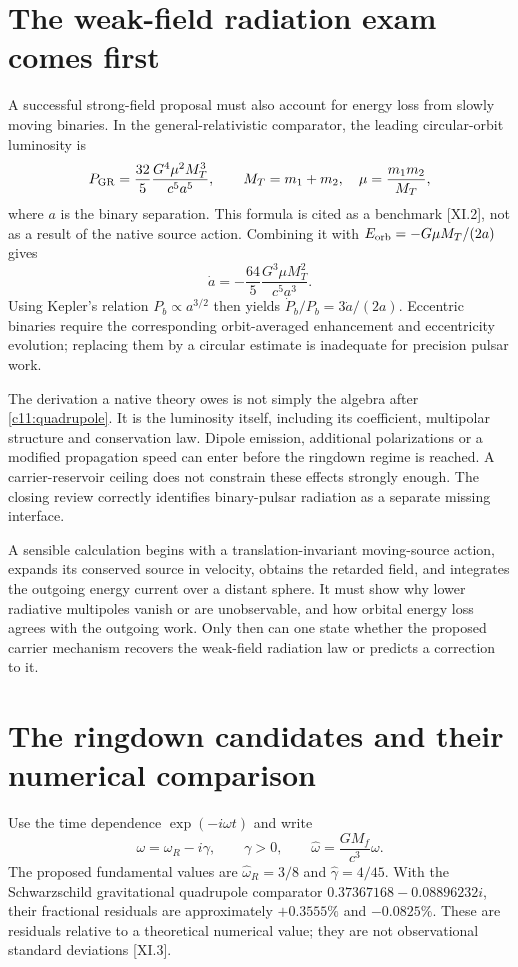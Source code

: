 \section{The weak-field radiation exam comes first}
A successful strong-field proposal must also account for energy loss from slowly moving binaries. In the general-relativistic comparator, the leading circular-orbit luminosity is
\begin{equation}
 P_{\rm GR}=\frac{32}{5}\frac{G^4\mu^2 M_T^3}{c^5 a^5},
 \qquad M_T=m_1+m_2,\quad \mu=\frac{m_1m_2}{M_T},
 \label{c11:quadrupole}
\end{equation}
where $a$ is the binary separation. This formula is cited as a benchmark [XI.2], not as a result of the native source action. Combining it with $E_{\rm orb}=-G\mu M_T/(2a)$ gives
\begin{equation}
 \dot a=-\frac{64}{5}\frac{G^3\mu M_T^2}{c^5a^3}.
 \label{c11:adot}
\end{equation}
Using Kepler's relation $P_b\propto a^{3/2}$ then yields $\dot P_b/P_b=3\dot a/(2a)$. Eccentric binaries require the corresponding orbit-averaged enhancement and eccentricity evolution; replacing them by a circular estimate is inadequate for precision pulsar work.

The derivation a native theory owes is not simply the algebra after \eqref{c11:quadrupole}. It is the luminosity itself, including its coefficient, multipolar structure and conservation law. Dipole emission, additional polarizations or a modified propagation speed can enter before the ringdown regime is reached. A carrier-reservoir ceiling does not constrain these effects strongly enough. The closing review correctly identifies binary-pulsar radiation as a separate missing interface.

A sensible calculation begins with a translation-invariant moving-source action, expands its conserved source in velocity, obtains the retarded field, and integrates the outgoing energy current over a distant sphere. It must show why lower radiative multipoles vanish or are unobservable, and how orbital energy loss agrees with the outgoing work. Only then can one state whether the proposed carrier mechanism recovers the weak-field radiation law or predicts a correction to it.

\section{The ringdown candidates and their numerical comparison}
Use the time dependence $\exp(-i\omega t)$ and write
\begin{equation}
 \omega=\omega_R-i\gamma,\qquad \gamma>0,\qquad
 \widehat\omega=\frac{GM_f}{c^3}\omega.
 \label{c11:frequencyconvention}
\end{equation}
The proposed fundamental values are $\widehat\omega_R=3/8$ and $\widehat\gamma=4/45$. With the Schwarzschild gravitational quadrupole comparator $0.37367168-0.08896232i$, their fractional residuals are approximately $+0.3555\%$ and $-0.0825\%$. These are residuals relative to a theoretical numerical value; they are not observational standard deviations [XI.3].

